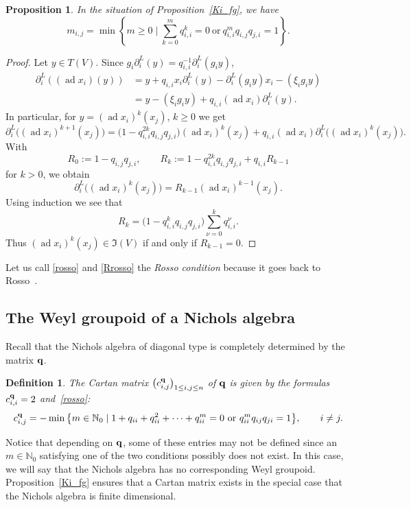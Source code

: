 \documentclass[10pt,a4paper]{amsart}
\numberwithin{equation}{section}
\newtheorem{Proposition}[Theorem]{Proposition}
\newtheorem{Definition}[Theorem]{Definition}
\newcommand{\NN }{\mathbb{N}}
\newcommand{\qq }{{\bf q}}
\newcommand{\del }{\partial^L}
\newcommand{\II }{\mathfrak{I}}
\DeclareMathOperator{\ad}{ad}
\begin{document}
\begin{Proposition}
In the situation of Proposition~{\rm \ref{Ki_fg}}, we have
\begin{equation}\label{rosso}
m_{i,j} = \min \left\{ m\ge 0\mid \sum_{k=0}^m q_{i,i}^k = 0\ \text{or} \ q_{i,i}^{m} q_{i,j}q_{j,i} = 1 \right\}.
\end{equation}
\end{Proposition}
\begin{proof}
Let $y\in T(V)$. Since $g_i \del_i(y) = q_{i,i}^{-1} \del_i(g_i y)$,
\begin{align*}
\del_i((\ad x_i)(y)) &= y+q_{i,i} x_i \del_i(y) - \del_i(g_i y) x_i - (\xi_i g_i y) \\
&= y - (\xi_i g_i y) + q_{i,i} (\ad x_i)\del_i(y).
\end{align*}
In particular, for $y=(\ad x_i)^{k}(x_j)$, $k\ge 0$ we get
\[ \del_i\big((\ad x_i)^{k+1}(x_j)\big) =
\big(1-q_{i,i}^{2k}q_{i,j}q_{j,i}\big) (\ad x_i)^{k}(x_j)
+ q_{i,i} (\ad x_i) \del_i\big((\ad x_i)^{k}(x_j)\big). \]
With
\begin{equation}\label{rosso_rec}
R_0:=1-q_{i,j}q_{j,i}, \qquad
R_k:=
1-q_{i,i}^{2k} q_{i,j}q_{j,i} + q_{i,i} R_{k-1}
\end{equation}
for $k>0$, we obtain
\[ \del_i\big((\ad x_i)^{k}(x_j)\big) = R_{k-1} (\ad x_i)^{k-1}(x_j). \]
Using induction we see that
\begin{equation}\label{Rrosso}
R_k = \big(1-q_{i,i}^{k} q_{i,j}q_{j,i}\big) \sum_{\nu=0}^{k} q_{i,i}^\nu.
\end{equation}
Thus $(\ad x_i)^{k}(x_j)\in\II(V)$ if and only if $R_{k-1}=0$.
\end{proof}

Let us call \eqref{rosso} and \eqref{Rrosso} the {\it Rosso condition} because it goes back to Rosso~\cite{MR1632802}.

\subsection{The Weyl groupoid of a Nichols algebra}

Recall that the Nichols algebra of diagonal type is completely determined by the matrix $\qq$.

\begin{Definition}
The {\it Cartan matrix} $\big(c^\qq_{i,j}\big)_{1\le i,j\le n}$ of $\qq$ is given by the formulas $c^\qq_{i,i}=2$ and~\eqref{rosso}:
\begin{gather}\label{rosso_cartan}
c^\qq_{i,j} = -\min\big\{ m\in \NN_0 \mid 1+q_{ii}+q_{ii}^2+\cdots+q_{ii}^m=0 \ \text{or}\ q_{ii}^m q_{ij}q_{ji}=1 \big\}, \qquad i\ne j.
\end{gather}
\end{Definition}
Notice that depending on $\qq$, some of these entries may not be defined since an $m\in\NN_0$ satisfying one of the two conditions possibly does not exist. In this case, we will say that the Nichols algebra has no corresponding Weyl groupoid.
Proposition~\ref{Ki_fg} ensures that a Cartan matrix exists in the special case that the Nichols algebra is finite dimensional.
\end{document}
